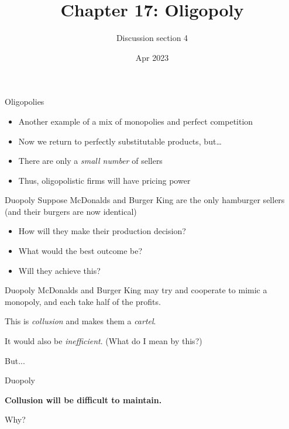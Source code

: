 \documentclass[aspectratio=169]{beamer}
\title{Chapter 17: Oligopoly}
\author{Discussion section 4}
\date{Apr 2023}
\begin{document}
\begin{frame}
    \titlepage 
\end{frame}

\begin{frame}{Oligopolies}
    \begin{itemize}
        \item Another example of a mix of monopolies and perfect competition
        \item Now we return to perfectly substitutable products, but\dots
        \item There are only a \textit{small number} of sellers
        \item Thus, oligopolistic firms will have pricing power
    \end{itemize}
\end{frame}

\begin{frame}{Duopoly}
    Suppose McDonalds and Burger King are the only hamburger sellers (and their burgers are now identical)
    \begin{itemize}
        \item How will they make their production decision?
        \item What would the best outcome be?
        \item Will they achieve this?
    \end{itemize}
\end{frame}

\begin{frame}{Duopoly}
    McDonalds and Burger King may try and cooperate to mimic a monopoly, and each take half of the profits.

    \vspace{2mm}

    This is \textit{collusion} and makes them a \textit{cartel}.

    \vspace{2mm}

    It would also be \textit{inefficient}. (What do I mean by this?)

    \vspace{2mm}

    But...

\end{frame}


\begin{frame}{Duopoly}
    \begin{center}
        \textbf{Collusion will be difficult to maintain.}

        \vspace{5mm}

        Why?

    \end{center}
\end{frame}
\end{document}
